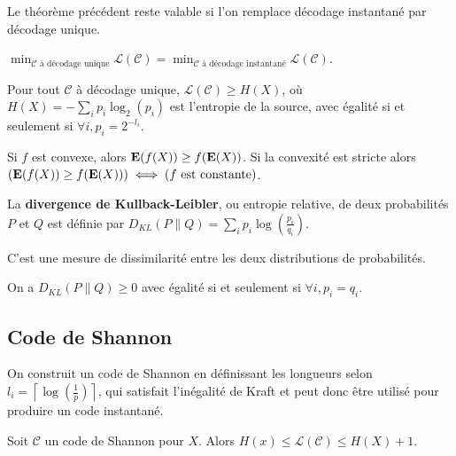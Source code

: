 \begin{thm}
	Le théorème précédent reste valable si l'on remplace décodage instantané par décodage unique.
\end{thm}

\begin{cor}
	$\min_{\mathcal{C} \text{ à décodage unique}} \mathcal{L}(\mathcal{C}) = \min_{\mathcal{C} \text{ à décodage instantané}} \mathcal{L}(\mathcal{C})$.
\end{cor}

\begin{thm}
	Pour tout $\mathcal{C}$ à décodage unique, $\mathcal{L}(\mathcal{C}) \geq H(X)$, où $H(X) = - \sum_i p_i \log_2(p_i)$ est l'entropie de la source, avec égalité si et seulement si $\forall i, p_i = 2^{-l_i}$.
\end{thm}

\begin{thm}
	Si $f$ est convexe, alors $\mathbf{E}(f(X)) \geq f(\mathbf{E}(X))$.
	Si la convexité est stricte alors $\left( \mathbf{E}(f(X)) \geq f(\mathbf{E}(X)) \right) \iff \left( f \text{ est constante}\right)$.
\end{thm}

\begin{defn}
	La \textbf{divergence de Kullback-Leibler}, ou entropie relative, de deux probabilités $P$ et $Q$ est définie par $D_{KL}(P \| Q) = \sum_i p_i \log \left( \frac{p_i}{q_i} \right)$.
\end{defn}

C'est une mesure de dissimilarité entre les deux distributions de probabilités.

\begin{cor}
	On a $D_{KL}(P \| Q) \geq 0$ avec égalité si et seulement si $\forall i, p_i = q_i$.
\end{cor}

\subsection{Code de Shannon}

	On construit un code de Shannon en définissant les longueurs selon $l_i = \left\lceil \log \left( \frac{1}{p} \right) \right\rceil$, qui satisfait l'inégalité de Kraft et peut donc être utilisé pour produire un code instantané.
	
	\begin{pop}
		Soit $\mathcal{C}$ un code de Shannon pour $X$. Alors $H(x) \leq \mathcal{L}(\mathcal{C}) \leq  H(X) + 1$.
	\end{pop}

